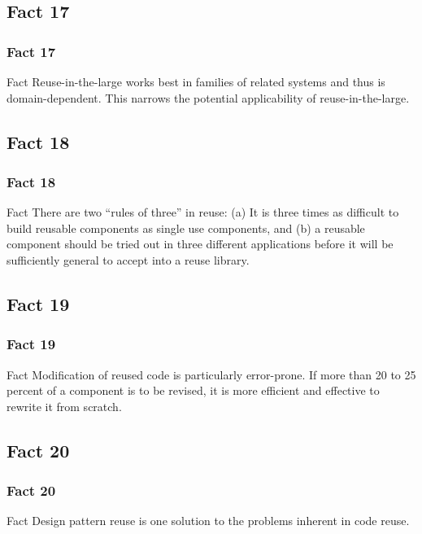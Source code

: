 \documentclass{beamer}
\begin{document}
\subsection{Fact 17}
\begin{frame}
    \frametitle{Fact 17}
    \begin{block}{Fact}
    Reuse-in-the-large works best in families of related systems and thus is
    domain-dependent. This narrows the potential applicability of
    reuse-in-the-large.
    \end{block}
\end{frame}

\subsection{Fact 18}
\begin{frame}
    \frametitle{Fact 18}
    \begin{block}{Fact}
    There are two \enquote{rules of three} in reuse: (a) It is three times as
    difficult to build reusable components as single use components, and (b) a
    reusable component should be tried out in three different applications
    before it will be sufficiently general to accept into a reuse library.
    \end{block}
\end{frame}

\subsection{Fact 19}
\begin{frame}
    \frametitle{Fact 19}
    \begin{block}{Fact}
    Modification of reused code is particularly error-prone. If more than 20 to
    25 percent of a component is to be revised, it is more efficient and
    effective to rewrite it from scratch.
    \end{block}
\end{frame}

\subsection{Fact 20}
\begin{frame}
    \frametitle{Fact 20}
    \begin{block}{Fact}
    Design pattern reuse is one solution to the problems inherent in code reuse.
    \end{block}
\end{frame}
\end{document}
